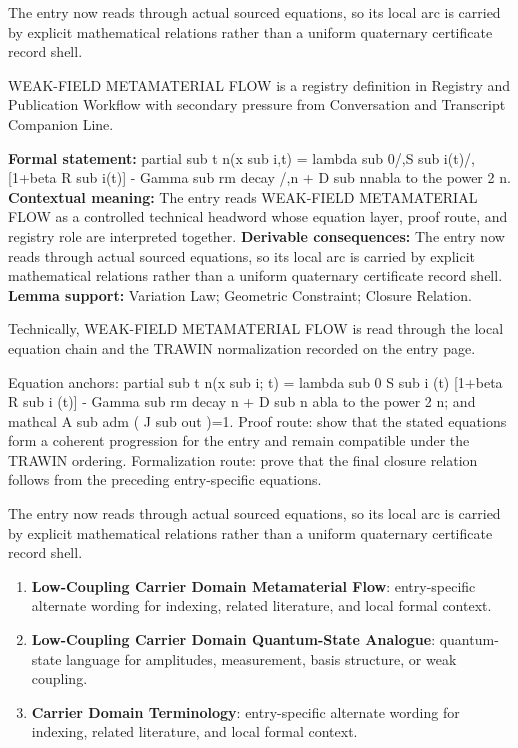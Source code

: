 The entry now reads through actual sourced equations, so its local arc is carried by explicit mathematical relations rather than a uniform quaternary certificate record shell.
\clearpage


\begingroup\small
{}
WEAK-FIELD METAMATERIAL FLOW is a registry definition in Registry and Publication Workflow with secondary pressure from Conversation and Transcript Companion Line.

\begingroup\footnotesize\setlength{\emergencystretch}{3em}\sloppy
\textbf{Formal statement:} partial sub t n(x sub i,t) = lambda sub 0/,S sub i(t)/,[1+beta R sub i(t)] - Gamma sub rm decay /,n + D sub nnabla to the power 2 n. \textbf{Contextual meaning:} The entry reads WEAK-FIELD METAMATERIAL FLOW as a controlled technical headword whose equation layer, proof route, and registry role are interpreted together. \textbf{Derivable consequences:} The entry now reads through actual sourced equations, so its local arc is carried by explicit mathematical relations rather than a uniform quaternary certificate record shell. \textbf{Lemma support:} Variation Law; Geometric Constraint; Closure Relation.\par
\endgroup

Technically, WEAK-FIELD METAMATERIAL FLOW is read through the local equation chain and the TRAWIN normalization recorded on the entry page.

Equation anchors: partial sub t n(x sub i; t) = lambda sub 0 S sub i (t) [1+beta R sub i (t)] - Gamma sub rm decay n + D sub n abla to the power 2 n; and mathcal A sub adm ( J sub out )=1. Proof route: show that the stated equations form a coherent progression for the entry and remain compatible under the TRAWIN ordering. Formalization route: prove that the final closure relation follows from the preceding entry-specific equations.

The entry now reads through actual sourced equations, so its local arc is carried by explicit mathematical relations rather than a uniform quaternary certificate record shell.
\endgroup

\begin{enumerate}[leftmargin=1.6em,itemsep=6pt,topsep=4pt]
\item \textbf{Low-Coupling Carrier Domain Metamaterial Flow}: entry-specific alternate wording for indexing, related literature, and local formal context.
\item \textbf{Low-Coupling Carrier Domain Quantum-State Analogue}: quantum-state language for amplitudes, measurement, basis structure, or weak coupling.
\item \textbf{Carrier Domain Terminology}: entry-specific alternate wording for indexing, related literature, and local formal context.
\end{enumerate}

